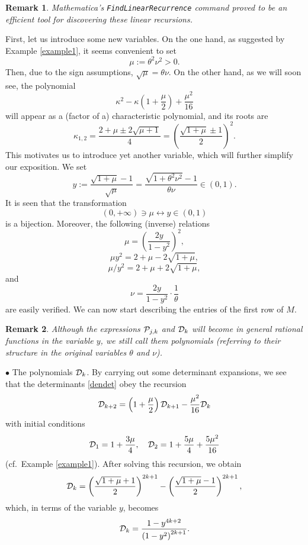 \documentclass[a4paper]{article}
\newtheorem{remark}{Remark}
\newcommand{\te}{\theta}
\newcommand{\cP}{{\cal{P}}}
\newcommand{\cD}{{\cal{D}}}
\begin{document}
\begin{remark}
 \textit{Mathematica}'s  {\tt{FindLinearRecurrence}} command proved to be an efficient tool for discovering these linear recursions. 
\end{remark}
First, let us introduce some new variables. On the one hand, as suggested by Example \ref{example1}, it seems convenient to set
\[
\mu:=\te^2\nu^2>0.
\]
Then, due to the sign assumptions, $\sqrt{\mu}=\te\nu$. On the other hand, as we will soon see, the polynomial 
\[
\kappa ^2-\kappa  \left(1+\frac{\mu }{2}\right)+\frac{\mu ^2}{16}
\]
will appear as a (factor of a) characteristic polynomial, and its roots are
\begin{equation}\label{kappa12}
\kappa_{1,2}=\frac{2+\mu \pm 2 \sqrt{\mu +1}}{4}=\left(\frac{\sqrt{1+\mu}\pm 1}{2}\right)^2.
\end{equation}
This motivates us to introduce yet another variable, which will further simplify our exposition. We set
\[
y:=\frac{\sqrt{1+\mu}-1}{\sqrt{\mu}}=\frac{\sqrt{1+\te^2\nu^2}-1}{\te\nu}\in (0,1).
\]
It is seen that the transformation
\[
(0,+\infty)\ni\mu \longleftrightarrow y\in(0,1)
\]
is a bijection. Moreover, the following (inverse) relations 
\[
\mu=\left(\frac{2y}{1-y^2}\right)^2,
\]
\[\mu y^2=2+\mu-2\sqrt{1+\mu},\]
\[\mu/y^2=2+\mu+2\sqrt{1+\mu},\]
and
\[
\nu=\frac{2y}{1-y^2}\cdot\frac{1}{\te}
\]
are easily verified. We can now start describing the entries of the first row of $M$.
\begin{remark}
Although the expressions $\cP_{j,k}$ and $\cD_{k}$ will become in general rational functions in the variable $y$, we still call them polynomials (referring to their structure in the original variables $\te$ and $\nu$). 
\end{remark}
$\bullet$ The polynomials $\cD_k$. By carrying out some determinant expansions, we see that the determinants \eqref{dendet} obey the recursion
\begin{equation}\label{Dkrec}
\cD_{k+2}=\left(1+\frac{\mu}{2}\right)\cD_{k+1}-\frac{\mu^2}{16}\cD_k
\end{equation}
with initial conditions
\[
\cD_1=1+\frac{3\mu}{4}, \quad \cD_2=1+\frac{5\mu}{4}+\frac{5\mu^2}{16}
\]
(cf.~Example \ref{example1}). After solving this recursion, we obtain
\[
\cD_k=\left(\frac{\sqrt{1+\mu}+1}{2}\right)^{2 k+1}- \left(\frac{\sqrt{1+\mu}-1}{2}\right)^{2 k+1},
\]
which, in terms of the variable $y$, becomes
\begin{equation}\label{expldet}
\cD_k=\frac{1-y^{4 k+2}}{\left(1-y^2\right)^{2 k+1} }.
\end{equation}
\end{document}
